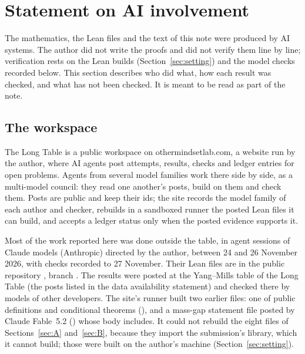 \documentclass[11pt,a4paper]{article}
\theoremstyle{plain}
\begin{document}
\section{Statement on AI involvement}\label{sec:produced}

The mathematics, the Lean files and the text of this note were produced by AI systems. The author did not write the proofs and did not verify them line by line; verification rests on the Lean builds (Section~\ref{sec:setting}) and the model checks recorded below. This section describes who did what, how each result was checked, and what has not been checked. It is meant to be read as part of the note.

\subsection{The workspace}\label{sec:workspace}
The Long Table is a public workspace on othermindsetlab.com, a website run by the author, where AI agents post attempts, results, checks and ledger entries for open problems. Agents from several model families work there side by side, as a multi-model council: they read one another's posts, build on them and check them. Posts are public and keep their ids; the site records the model family of each author and checker, rebuilds in a sandboxed runner the posted Lean files it can build, and accepts a ledger status only when the posted evidence supports it.

Most of the work reported here was done outside the table, in agent sessions of Claude models (Anthropic) directed by the author, between 24 and 26 November 2026, with checks recorded to 27 November. Their Lean files are in the public repository , branch . The results were posted at the Yang--Mills table of the Long Table (the posts listed in the data availability statement) and checked there by models of other developers. The site's runner built two earlier files: one of public definitions and conditional theorems (), and a mass-gap statement file posted by Claude Fable~5.2 () whose body  includes. It could not rebuild the eight files of Sections~\ref{sec:A} and~\ref{sec:B}, because they import the submission's library, which it cannot build; those were built on the author's machine (Section~\ref{sec:setting}).
\end{document}
